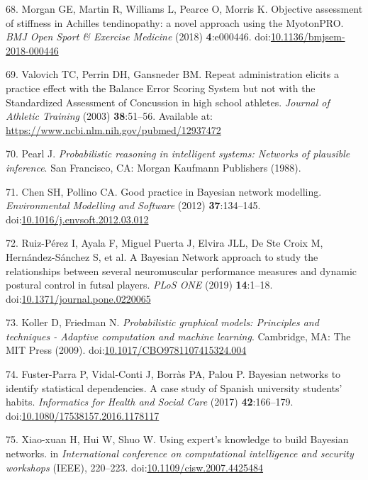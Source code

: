 \documentclass[
  english,
  man]{apa6}
\newenvironment{cslreferences}%
  {}%
  {\par}
\begin{document}
\begin{cslreferences}
\leavevmode\hypertarget{ref-Morgan2018}{}%
68. Morgan GE, Martin R, Williams L, Pearce O, Morris K. Objective assessment of stiffness in Achilles tendinopathy: a novel approach using the MyotonPRO. \emph{BMJ Open Sport \& Exercise Medicine} (2018) \textbf{4}:e000446. doi:\href{https://doi.org/10.1136/bmjsem-2018-000446}{10.1136/bmjsem-2018-000446}

\leavevmode\hypertarget{ref-Valovich2003}{}%
69. Valovich TC, Perrin DH, Gansneder BM. Repeat administration elicits a practice effect with the Balance Error Scoring System but not with the Standardized Assessment of Concussion in high school athletes. \emph{Journal of Athletic Training} (2003) \textbf{38}:51--56. Available at: \url{https://www.ncbi.nlm.nih.gov/pubmed/12937472}

\leavevmode\hypertarget{ref-Pearl1988}{}%
70. Pearl J. \emph{Probabilistic reasoning in intelligent systems: Networks of plausible inference}. San Francisco, CA: Morgan Kaufmann Publishers (1988).

\leavevmode\hypertarget{ref-Chen2012}{}%
71. Chen SH, Pollino CA. Good practice in Bayesian network modelling. \emph{Environmental Modelling and Software} (2012) \textbf{37}:134--145. doi:\href{https://doi.org/10.1016/j.envsoft.2012.03.012}{10.1016/j.envsoft.2012.03.012}

\leavevmode\hypertarget{ref-Ruiz-Perez2019}{}%
72. Ruiz-Pérez I, Ayala F, Miguel Puerta J, Elvira JLL, De Ste Croix M, Hernández-Sánchez S, et al. A Bayesian Network approach to study the relationships between several neuromuscular performance measures and dynamic postural control in futsal players. \emph{PLoS ONE} (2019) \textbf{14}:1--18. doi:\href{https://doi.org/10.1371/journal.pone.0220065}{10.1371/journal.pone.0220065}

\leavevmode\hypertarget{ref-Koller2009}{}%
73. Koller D, Friedman N. \emph{Probabilistic graphical models: Principles and techniques - Adaptive computation and machine learning}. Cambridge, MA: The MIT Press (2009). doi:\href{https://doi.org/10.1017/CBO9781107415324.004}{10.1017/CBO9781107415324.004}

\leavevmode\hypertarget{ref-Fuster-Parra2017}{}%
74. Fuster-Parra P, Vidal-Conti J, Borràs PA, Palou P. Bayesian networks to identify statistical dependencies. A case study of Spanish university students' habits. \emph{Informatics for Health and Social Care} (2017) \textbf{42}:166--179. doi:\href{https://doi.org/10.1080/17538157.2016.1178117}{10.1080/17538157.2016.1178117}

\leavevmode\hypertarget{ref-Xiao-xuan2007}{}%
75. Xiao-xuan H, Hui W, Shuo W. Using expert's knowledge to build Bayesian networks. in \emph{International conference on computational intelligence and security workshops} (IEEE), 220--223. doi:\href{https://doi.org/10.1109/cisw.2007.4425484}{10.1109/cisw.2007.4425484}


\end{cslreferences}
\end{document}
